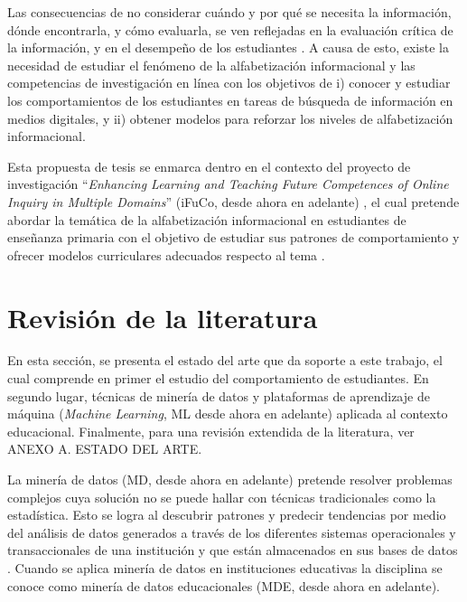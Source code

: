 \newpage
Las consecuencias de no considerar cuándo y por qué se necesita la información, dónde encontrarla, y cómo evaluarla, se ven reflejadas en la evaluación crítica de la información, y en el desempeño de los estudiantes \cite{urra2016alfabetizacion}. A causa de esto, existe la necesidad de estudiar el fenómeno de la alfabetización informacional y las competencias de investigación en línea con los objetivos de i) conocer y estudiar los comportamientos de los estudiantes en tareas de búsqueda de información en medios digitales, y ii) obtener modelos para reforzar los niveles de alfabetización informacional. 

Esta propuesta de tesis se enmarca dentro en el contexto del proyecto de investigación “\textit{Enhancing Learning and Teaching Future Competences of Online Inquiry in Multiple Domains}” (iFuCo, desde ahora en adelante) \cite{CONICYT2015-listadoproyectos}, el cual pretende abordar la temática de la alfabetización informacional en estudiantes de enseñanza primaria con el objetivo de estudiar sus patrones de comportamiento y ofrecer modelos curriculares adecuados respecto al tema \cite{ifuco2015}.

\section{Revisión de la literatura}
\label{sec:revision-literatura}
En esta sección, se presenta el estado del arte que da soporte a este trabajo, el cual comprende en primer el estudio del comportamiento de estudiantes. En segundo lugar, técnicas de minería de datos y plataformas de aprendizaje de máquina (\textit{Machine Learning}, ML desde ahora en adelante) aplicada al contexto educacional. Finalmente, para una revisión extendida de la literatura, ver ANEXO A. ESTADO DEL ARTE.

La minería de datos (MD, desde ahora en adelante) pretende resolver problemas complejos cuya solución no se puede hallar con técnicas tradicionales como la estadística. Esto se logra al descubrir patrones y predecir tendencias por medio del análisis de datos generados a través de los diferentes sistemas operacionales y transaccionales de una institución y que están almacenados en sus bases de datos \cite{witten2016data}. Cuando se aplica minería de datos en instituciones educativas la disciplina se conoce como minería de datos educacionales (MDE, desde ahora en adelante).

